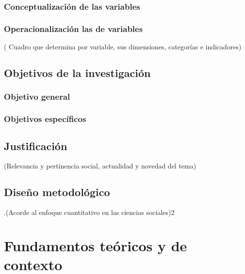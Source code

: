 \documentclass[12pt,letterpaper,titlepage,oneside]{book}
\begin{document}
\subsection*{Conceptualización de las variables}

\subsection*{Operacionalización las de variables}
( Cuadro que determina por variable, sus dimensiones, categorías e indicadores)

\section*{Objetivos de la investigación}

\subsection*{Objetivo general}

\subsection*{Objetivos específicos}

\section*{Justificación}
  (Relevancia y    pertinencia  social,  actualidad y novedad del tema)

\section*{Diseño metodológico}
 .(Acorde al enfoque cuantitativo en las ciencias sociales)2

\chapter{Fundamentos teóricos y de contexto}
\end{document}
